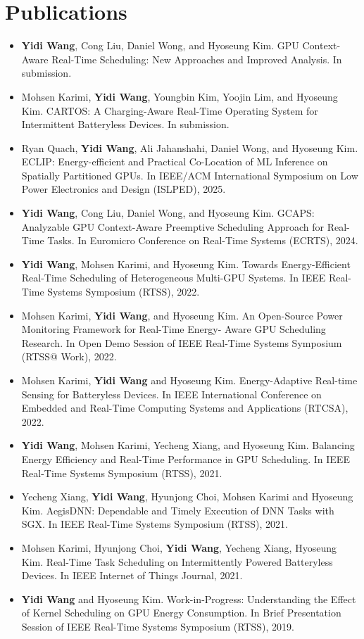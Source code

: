 \documentclass[letterpaper,10pt]{article}
\begin{document}
  \section{Publications}
  \begin{justify}
  \begin{itemize}
    \item \textbf{Yidi Wang}, Cong Liu, Daniel Wong, and Hyoseung Kim. GPU Context-Aware Real-Time Scheduling: New Approaches and Improved Analysis. In submission.
    \item Mohsen Karimi, \textbf{Yidi Wang}, Youngbin Kim, Yoojin Lim, and Hyoseung Kim. CARTOS: A Charging-Aware Real-Time Operating System for Intermittent Batteryless Devices. In submission.
    \item Ryan Quach, \textbf{Yidi Wang}, Ali Jahanshahi, Daniel Wong, and Hyoseung Kim. ECLIP: Energy-efficient and Practical Co-Location of ML Inference on Spatially Partitioned GPUs. In IEEE/ACM International Symposium on Low Power Electronics and Design (ISLPED), 2025.
    \item \textbf{Yidi Wang}, Cong Liu, Daniel Wong, and Hyoseung Kim. GCAPS: Analyzable GPU Context-Aware Preemptive Scheduling Approach for Real-Time Tasks. In Euromicro Conference on Real-Time Systems (ECRTS), 2024.
    \item \textbf{Yidi Wang}, Mohsen Karimi, and Hyoseung Kim. Towards Energy-Efficient Real-Time Scheduling of Heterogeneous Multi-GPU Systems. In IEEE Real-Time Systems Symposium (RTSS), 2022.
    \item Mohsen Karimi, \textbf{Yidi Wang}, and Hyoseung Kim. An Open-Source Power Monitoring Framework for Real-Time Energy- Aware GPU Scheduling Research. In Open Demo Session of IEEE Real-Time Systems Symposium (RTSS@ Work), 2022.
    \item Mohsen Karimi, \textbf{Yidi Wang} and Hyoseung Kim. Energy-Adaptive Real-time Sensing for Batteryless Devices. In IEEE International Conference on Embedded and Real-Time Computing Systems and Applications (RTCSA), 2022.
    \item \textbf{Yidi Wang}, Mohsen Karimi, Yecheng Xiang, and Hyoseung Kim. Balancing Energy Efficiency and Real-Time Performance in GPU Scheduling. In IEEE Real-Time Systems Symposium (RTSS), 2021.
    \item Yecheng Xiang, \textbf{Yidi Wang}, Hyunjong Choi, Mohsen Karimi and Hyoseung Kim. AegisDNN: Dependable and Timely Execution of DNN Tasks with SGX. In IEEE Real-Time Systems Symposium (RTSS), 2021.
    \item Mohsen Karimi, Hyunjong Choi, \textbf{Yidi Wang}, Yecheng Xiang, Hyoseung Kim. Real-Time Task Scheduling on Intermittently Powered Batteryless Devices. In IEEE Internet of Things Journal, 2021.
    \item \textbf{Yidi Wang} and Hyoseung Kim. Work-in-Progress: Understanding the Effect of Kernel Scheduling on GPU Energy Consumption. In Brief Presentation Session of IEEE Real-Time Systems Symposium (RTSS), 2019.
  \end{itemize}
  \end{justify}
\end{document}
